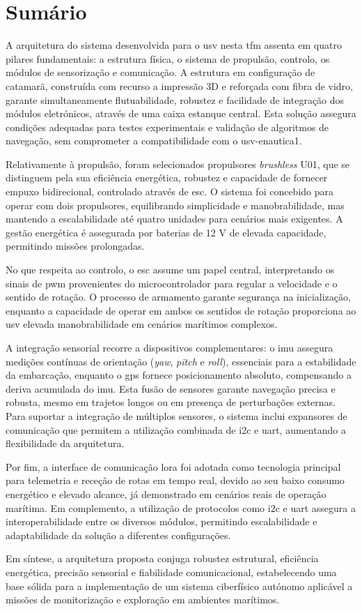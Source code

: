 \section{Sumário}

A arquitetura do sistema desenvolvida para o \gls{usv} nesta \gls{tfm} assenta em quatro pilares fundamentais: a estrutura física, o sistema de propulsão, controlo, os módulos de sensorização e comunicação. A estrutura em configuração de catamarã, construída com recurso a impressão 3D e reforçada com fibra de vidro, garante simultaneamente flutuabilidade, robustez e facilidade de integração dos módulos eletrónicos, através de uma caixa estanque central. Esta solução assegura condições adequadas para testes experimentais e validação de algoritmos de navegação, sem comprometer a compatibilidade com o \gls{usv}-enautica1.

Relativamente à propulsão, foram selecionados propulsores \emph{brushless} U01, que se distinguem pela sua eficiência energética, robustez e capacidade de fornecer empuxo bidirecional, controlado através de \gls{esc}. O sistema foi concebido para operar com dois propulsores, equilibrando simplicidade e manobrabilidade, mas mantendo a escalabilidade até quatro unidades para cenários mais exigentes. A gestão energética é assegurada por baterias de 12 V de elevada capacidade, permitindo missões prolongadas.

No que respeita ao controlo, o \gls{esc} assume um papel central, interpretando os sinais de \gls{pwm} provenientes do microcontrolador para regular a velocidade e o sentido de rotação. O processo de armamento garante segurança na inicialização, enquanto a capacidade de operar em ambos os sentidos de rotação proporciona ao \gls{usv} elevada manobrabilidade em cenários marítimos complexos.

A integração sensorial recorre a dispositivos complementares: o \gls{imu} assegura medições contínuas de orientação (\emph{yaw}, \emph{pitch} e \emph{roll}), essenciais para a estabilidade da embarcação, enquanto o \gls{gps} fornece posicionamento absoluto, compensando a deriva acumulada do \gls{imu}. Esta fusão de sensores garante navegação precisa e robusta, mesmo em trajetos longos ou em presença de perturbações externas. Para suportar a integração de múltiplos sensores, o sistema inclui expansores de comunicação que permitem a utilização combinada de \gls{i2c} e \gls{uart}, aumentando a flexibilidade da arquitetura.

Por fim, a interface de comunicação \gls{lora} foi adotada como tecnologia principal para telemetria e receção de rotas em tempo real, devido ao seu baixo consumo energético e elevado alcance, já demonstrado em cenários reais de operação marítima. Em complemento, a utilização de protocolos como \gls{i2c} e \gls{uart} assegura a interoperabilidade entre os diversos módulos, permitindo escalabilidade e adaptabilidade da solução a diferentes configurações.

Em síntese, a arquitetura proposta conjuga robustez estrutural, eficiência energética, precisão sensorial e fiabilidade comunicacional, estabelecendo uma base sólida para a implementação de um sistema ciberfísico autónomo aplicável a missões de monitorização e exploração em ambientes marítimos.
